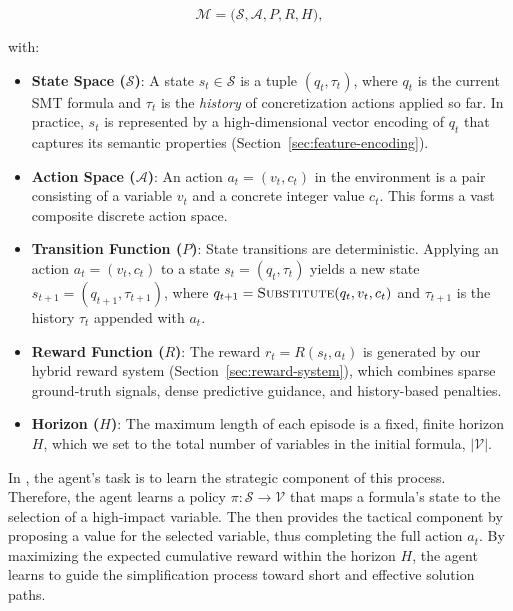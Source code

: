 $$
\mathcal{M}=\bigl(\mathcal{S},\mathcal{A},P,R,H\bigr),
$$

with:
\begin{itemize}[leftmargin=*]
\item \textbf{State Space ($\mathcal{S}$)}: A state $s_t \in \mathcal{S}$ is a tuple $(q_t, \tau_t)$, where $q_t$ is the current SMT formula and $\tau_t$ is the \textit{history} of concretization actions applied so far. In practice, $s_t$ is represented by a high-dimensional vector encoding of $q_t$ that captures its semantic properties (Section~\ref{sec:feature-encoding}).
\item \textbf{Action Space ($\mathcal{A}$)}: An action $a_t = (v_t, c_t)$ in the environment is a pair consisting of a variable $v_t$ and a concrete integer value $c_t$. This forms a vast composite discrete action space.
\item \textbf{Transition Function ($P$)}: State transitions are deterministic. Applying an action $a_t=(v_t, c_t)$ to a state $s_t=(q_t, \tau_t)$ yields a new state $s_{t+1} = (q_{t+1}, \tau_{t+1})$, where $q_{t+1} = \textsc{Substitute}(q_t, v_t, c_t)$ and $\tau_{t+1}$ is the history $\tau_t$ appended with $a_t$.
\item \textbf{Reward Function ($R$)}: The reward $r_t = R(s_t, a_t)$ is generated by our hybrid reward system (Section~\ref{sec:reward-system}), which combines sparse ground-truth signals, dense predictive guidance, and history-based penalties.
\item \textbf{Horizon ($H$)}: The maximum length of each episode is a fixed, finite horizon $H$, which we set to the total number of variables in the initial formula, $|\mathcal{V}|$.
\end{itemize}
In \tool{}, the \RL{} agent's task is to learn the strategic component of this process. Therefore, the agent learns a policy $\pi: \mathcal{S} \rightarrow \mathcal{V}$ that maps a formula's state to the selection of a high-impact variable. The \LLM{} then provides the tactical component by proposing a value for the selected variable, thus completing the full action $a_t$. By maximizing the expected cumulative reward within the horizon $H$, the \RL{} agent learns to guide the simplification process toward short and effective solution paths.